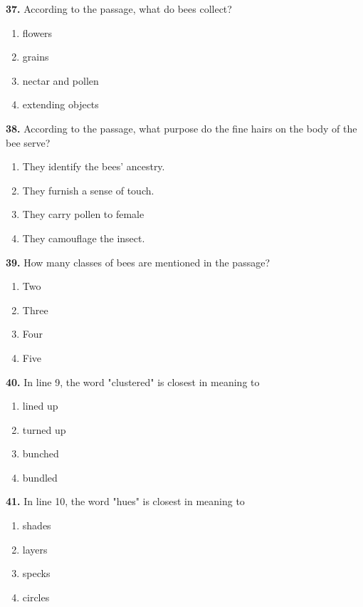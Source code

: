 \documentclass[12pt]{article}
\begin{document}
\vspace{0.25\baselineskip}
\noindent\textbf{37.} According to the passage, what do bees collect?
\begin{enumerate}[label=(\Alph*),leftmargin=*,itemsep=0.2em]
\item flowers
\item grains
\item nectar and pollen
\item extending objects
\end{enumerate}
\par
\vspace{0.25\baselineskip}
\noindent\textbf{38.} According to the passage, what purpose do the fine hairs on the body of the bee serve?
\begin{enumerate}[label=(\Alph*),leftmargin=*,itemsep=0.2em]
\item They identify the bees' ancestry.
\item They furnish a sense of touch.
\item They carry pollen to female
\item They camouflage the insect.
\end{enumerate}
\par
\vspace{0.25\baselineskip}
\noindent\textbf{39.} How many classes of bees are mentioned in the passage?
\begin{enumerate}[label=(\Alph*),leftmargin=*,itemsep=0.2em]
\item Two
\item Three
\item Four
\item Five
\end{enumerate}
\par
\vspace{0.25\baselineskip}
\noindent\textbf{40.} In line 9, the word "clustered" is closest in meaning to
\begin{enumerate}[label=(\Alph*),leftmargin=*,itemsep=0.2em]
\item lined up
\item turned up
\item bunched
\item bundled
\end{enumerate}
\par
\vspace{0.25\baselineskip}
\noindent\textbf{41.} In line 10, the word "hues" is closest in meaning to
\begin{enumerate}[label=(\Alph*),leftmargin=*,itemsep=0.2em]
\item shades
\item layers
\item specks
\item circles
\end{enumerate}
\end{document}
